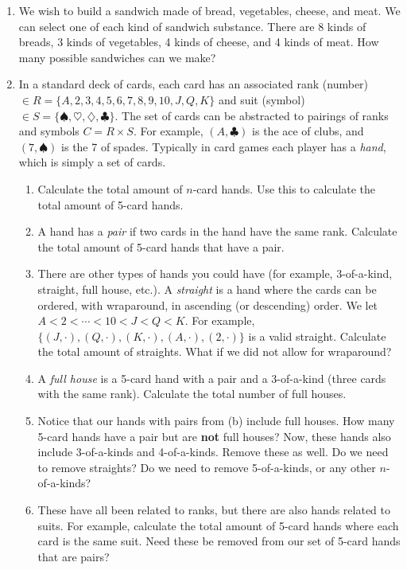 \documentclass[main.tex]{subfiles}
\begin{document}
\begin{enumerate}
	\item We wish to build a sandwich made of bread, vegetables, cheese, and meat. We can select one of each kind of sandwich substance. There are 8 kinds of breads, 3 kinds of vegetables, 4 kinds of cheese, and 4 kinds of meat. How many possible sandwiches can we make?
	\item In a standard deck of cards, each card has an associated rank (number) \(\in R=\{A,2,3,4,5,6,7,8,9,10,J,Q,K\}\) and suit (symbol) \(\in S=\{\spadesuit,\heartsuit,\diamondsuit,\clubsuit\}\). The set of cards can be abstracted to pairings of ranks and symbols \(C = R \times S\). For example, \((A,\clubsuit)\) is the ace of clubs, and \((7,\spadesuit)\) is the 7 of spades. Typically in card games each player has a \textit{hand}, which is simply a set of cards.
	\begin{enumerate}
		\item Calculate the total amount of \(n\)-card hands. Use this to calculate the total amount of 5-card hands.
		\item A hand has a \textit{pair} if two cards in the hand have the same rank. Calculate the total amount of 5-card hands that have a pair.
		\item There are other types of hands you could have (for example, 3-of-a-kind, straight, full house, etc.). A \textit{straight} is a hand where the cards can be ordered, with wraparound, in ascending (or descending) order. We let \(A < 2 < \cdots < 10 < J < Q < K\). For example, \(\{(J,\cdot), (Q,\cdot), (K,\cdot), (A,\cdot), (2,\cdot)\}\) is a valid straight. Calculate the total amount of straights. What if we did not allow for wraparound?
		\item A \textit{full house} is a 5-card hand with a pair and a 3-of-a-kind (three cards with the same rank). Calculate the total number of full houses.
		\item Notice that our hands with pairs from (b) include full houses. How many 5-card hands have a pair but are \textbf{not} full houses? Now, these hands also include 3-of-a-kinds and 4-of-a-kinds. Remove these as well. Do we need to remove straights? Do we need to remove 5-of-a-kinds, or any other \(n\)-of-a-kinds?
		\item These have all been related to ranks, but there are also hands related to suits. For example, calculate the total amount of 5-card hands where each card is the same suit. Need these be removed from our set of 5-card hands that are pairs?
	\end{enumerate}

\end{enumerate}
\end{document}
